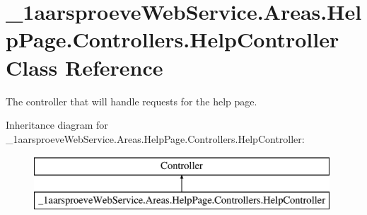 \hypertarget{class__1aarsproeve_web_service_1_1_areas_1_1_help_page_1_1_controllers_1_1_help_controller}{}\section{\+\_\+1aarsproeve\+Web\+Service.\+Areas.\+Help\+Page.\+Controllers.\+Help\+Controller Class Reference}
\label{class__1aarsproeve_web_service_1_1_areas_1_1_help_page_1_1_controllers_1_1_help_controller}


The controller that will handle requests for the help page.  


Inheritance diagram for \+\_\+1aarsproeve\+Web\+Service.\+Areas.\+Help\+Page.\+Controllers.\+Help\+Controller\+:\begin{figure}[H]
\begin{center}
\leavevmode
\includegraphics[height=2.000000cm]{class__1aarsproeve_web_service_1_1_areas_1_1_help_page_1_1_controllers_1_1_help_controller}
\end{center}
\end{figure}

